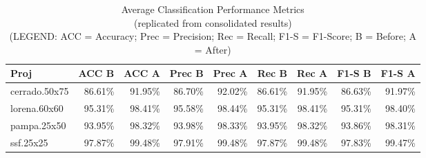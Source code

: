 \begin{table}[!h]
\centering
\caption{\large Average Classification Performance Metrics\\{\small (replicated from consolidated results)}\\{\small (LEGEND: ACC = Accuracy; Prec = Precision; Rec = Recall; F1-S = F1-Score; B = Before; A = After)}}
\label{tab:classification_performance_metrics}
\begin{tabular}{@{}lrrrrrrrr@{}}
\hline
Proj & ACC B & ACC A & Prec B & Prec A & Rec B & Rec A & F1-S B & F1-S A \\ \hline
cerrado.50x75 & 86.61\% & 91.95\% & 86.70\% & 92.02\% & 86.61\% & 91.95\% & 86.63\% & 91.97\% \\
lorena.60x60 & 95.31\% & 98.41\% & 95.58\% & 98.44\% & 95.31\% & 98.41\% & 95.31\% & 98.40\% \\
pampa.25x50 & 93.95\% & 98.32\% & 93.98\% & 98.33\% & 93.95\% & 98.32\% & 93.86\% & 98.31\% \\
ssf.25x25 & 97.87\% & 99.48\% & 97.91\% & 99.48\% & 97.87\% & 99.48\% & 97.83\% & 99.47\% \\
\hline
\end{tabular}
\end{table}